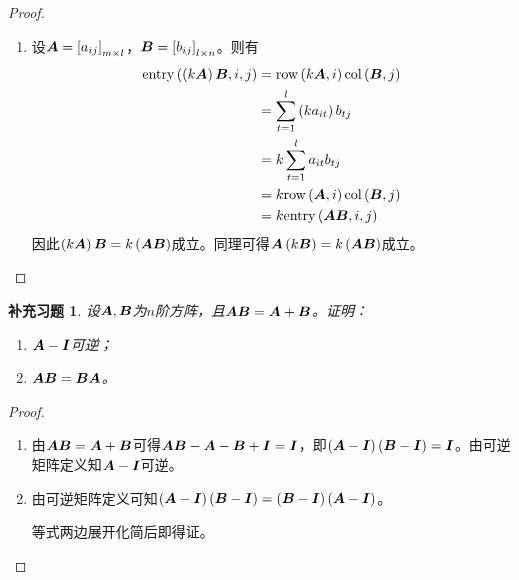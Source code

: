 \documentclass{ctexart}
\newtheorem{suplprob}{补充习题}[section]
\begin{document}
\begin{proof}
\begin{enumerate}
        \item
              {
              设\(\boldsymbol{A}=\left[ a_{ij} \right]_{m\times l}\)，\(\boldsymbol{B}=\left[ b_{ij} \right]_{l\times n}\)。则有
              \begin{align*}
                  \mathrm{entry}\left( \left( k\boldsymbol{A} \right)\boldsymbol{B},i,j \right) & =\mathrm{row}\left( k\boldsymbol{A},i \right)\mathrm{col}\left( \boldsymbol{B},j \right)     \\
                                                    & =\sum_{t=1}^l\left( ka_{it} \right)b_{tj} \\
                                                    & =k\sum_{t=1}^la_{it}b_{tj}         \\
                                                    & =k\mathrm{row}\left( \boldsymbol{A},i \right)\mathrm{col}\left( \boldsymbol{B},j \right)     \\
                                                    & =k\mathrm{entry}\left( \boldsymbol{A}\boldsymbol{B},i,j \right)
              \end{align*}
              因此\(\left( k\boldsymbol{A} \right)\boldsymbol{B}=k\left( \boldsymbol{A}\boldsymbol{B} \right)\)成立。同理可得\(\boldsymbol{A}\left( k\boldsymbol{B} \right)=k\left( \boldsymbol{A}\boldsymbol{B} \right)\)成立。
              }
    \end{enumerate}
\end{proof}

\begin{suplprob}
    设\(\boldsymbol{A},\boldsymbol{B}\)为\(n\)阶方阵，且\(\boldsymbol{A}\boldsymbol{B}=\boldsymbol{A}+\boldsymbol{B}\)。证明：
    \begin{enumerate}
        \item \(\boldsymbol{A}-\boldsymbol{I}\)可逆；
        \item \(\boldsymbol{A}\boldsymbol{B}=\boldsymbol{B}\boldsymbol{A}\)。
    \end{enumerate}
\end{suplprob}
\begin{proof}
    \begin{enumerate}
        \item
              {
              由\(\boldsymbol{A}\boldsymbol{B}=\boldsymbol{A}+\boldsymbol{B}\)可得\(\boldsymbol{A}\boldsymbol{B}-\boldsymbol{A}-\boldsymbol{B}+\boldsymbol{I}=\boldsymbol{I}\)，即\(\left( \boldsymbol{A}-\boldsymbol{I} \right)\left( \boldsymbol{B}-\boldsymbol{I} \right)=\boldsymbol{I}\)。由可逆矩阵定义知\(\boldsymbol{A}-\boldsymbol{I}\)可逆。
              }
        \item
              {
              由可逆矩阵定义可知\(\left( \boldsymbol{A}-\boldsymbol{I} \right)\left( \boldsymbol{B}-\boldsymbol{I} \right)=\left( \boldsymbol{B}-\boldsymbol{I} \right)\left( \boldsymbol{A}-\boldsymbol{I} \right)\)。

              等式两边展开化简后即得证。
              }
    \end{enumerate}
\end{proof}
\end{document}

